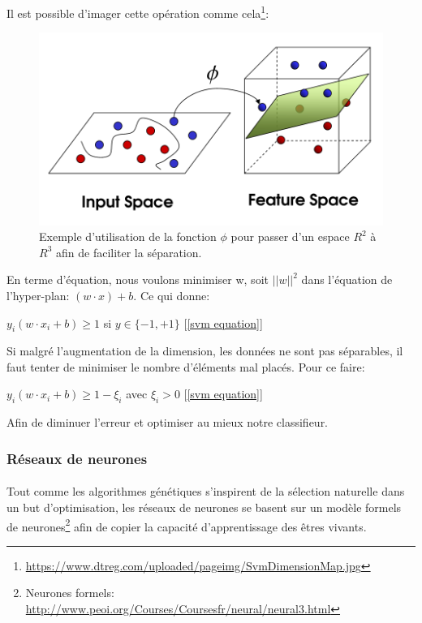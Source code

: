 \documentclass[a4paper, 11pt]{article}
\begin{document}
Il est possible d'imager cette opération comme cela\footnote{\url{https://www.dtreg.com/uploaded/pageimg/SvmDimensionMap.jpg}}:
\begin{figure}[H]
\centering
\includegraphics[scale=0.3]{images/svm_exemple_phi}
\caption{Exemple d'utilisation de la fonction $\phi$ pour passer d'un espace $R^2$ à $R^3$ afin de faciliter la séparation.}
\end{figure}


En terme d'équation, nous voulons minimiser w, soit $||w||^2$ dans l'équation de l'hyper-plan: $(w \cdot x) + b$. Ce qui donne:
\begin{center}
$y_i (w \cdot x_i + b) \ge 1$ si $y \in \{-1, +1\}$ [\ref{svm equation}]
\end{center}
Si malgré l'augmentation de la dimension, les données ne sont pas séparables, il faut tenter de minimiser le nombre d'éléments mal placés. Pour ce faire:
\begin{center}
$y_i (w \cdot x_i + b) \ge 1 - \xi_i$ avec $\xi_i > 0$ [\ref{svm equation}]
\end{center}
Afin de diminuer l'erreur et optimiser au mieux notre classifieur.


\subsubsection{Réseaux de neurones}
\paragraph{}
Tout comme les algorithmes génétiques s'inspirent de la sélection naturelle dans un but d'optimisation, les réseaux de neurones se basent sur un modèle formels de neurones\footnote{Neurones formels: \url{http://www.peoi.org/Courses/Coursesfr/neural/neural3.html}} afin de copier la capacité d'apprentissage des êtres vivants.
\end{document}
